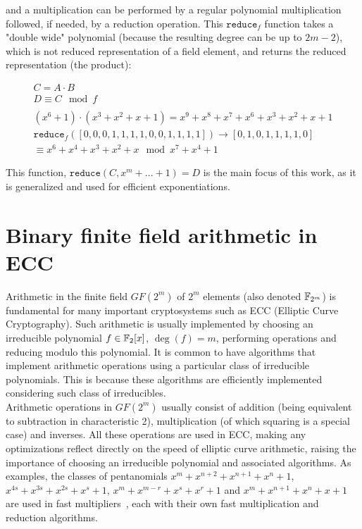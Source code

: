 and a multiplication can be performed by a regular polynomial multiplication followed, if needed, by a reduction operation. This $\texttt{reduce}_f$ function takes a "double wide" polynomial (because the resulting degree can be up to $2m-2$), which is not reduced representation of a field element, and returns the reduced representation (the product):

\begin{gather*}
C = A \cdot B\\
D \equiv C \mod f\\
\\
(x^6+1) \cdot (x^3+x^2+x+1) = x^9 + x^8 + x^7 + x^6 + x^3 + x^2 + x + 1 \\
\texttt{reduce}_f([0, 0, 0, 1, 1, 1, 1, 0, 0, 1, 1, 1, 1]) \rightarrow [0, 1, 0, 1, 1, 1, 1, 0]\\
\equiv x^6 + x^4 + x^3 + x^2 + x \mod x^7+x^4+1
\end{gather*}

This function, $\texttt{reduce}(C, x^m+...+1) = D$ is the main focus of this work, as it is generalized and used for efficient exponentiations.

\section{Binary finite field arithmetic in ECC} \label{background:binary}


Arithmetic in the finite field $GF(2^m)$ of $2^m$ elements (also denoted $\mathbb{F}_{2^m}$) is fundamental for many important cryptosystems such as ECC (Elliptic Curve Cryptography). Such arithmetic is usually implemented by choosing an irreducible polynomial $f \in \mathbb{F}_2[x]$, $\deg(f) = m$, performing operations and reducing modulo this polynomial. It is common to have algorithms that implement arithmetic operations using a particular class of irreducible polynomials. This is because these algorithms are efficiently implemented considering such class of irreducibles.\\

Arithmetic operations in $GF(2^m)$ usually consist of addition (being equivalent to subtraction in characteristic 2), multiplication (of which squaring is a special case) and inverses. All these operations are used in ECC, making any optimizations reflect directly on the speed of elliptic curve arithmetic, raising the importance of choosing an irreducible polynomial and associated algorithms. As examples, the classes of pentanomials $x^m+x^{n+2}+x^{n+1}+x^{n}+1$, $x^{4s}+x^{3s}+x^{2s}+x^s+1$, $x^m+x^{m-r}+x^s+x^r+1$ and $x^m+x^{n+1}+x^n+x+1$ are used in fast multipliers~\cite{fan2015survey}, each with their own fast multiplication and reduction algorithms.\\

